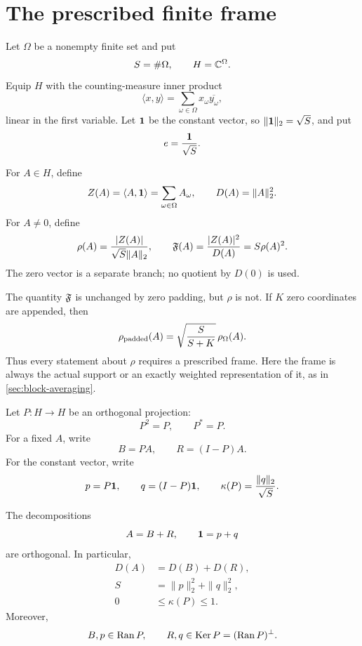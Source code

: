 \section{The prescribed finite frame}
\label{sec:finite-frame}

Let \(\Omega\) be a nonempty finite set and put
\[
 S=\#\Omega,\qquad
 H=\mathbb C^\Omega.
\]
Equip \(H\) with the counting-measure inner product
\[
 \langle x,y\rangle
 =
 \sum_{\omega\in\Omega}
 x_\omega\overline{y_\omega},
\]
linear in the first variable.  Let \(\mathbf 1\) be the constant vector,
so \(\|\mathbf 1\|_2=\sqrt S\), and put
\[
 e=\frac{\mathbf 1}{\sqrt S}.
\]

\begin{definition}
\label{def:literal-statistics}
For \(A\in H\), define
\[
 Z(A)=\langle A,\mathbf 1\rangle
 =\sum_{\omega\in\Omega}A_\omega,
\qquad
 D(A)=\|A\|_2^2.
\]
For \(A\ne0\), define
\[
 \rho(A)
 =\frac{|Z(A)|}{\sqrt{S}\|A\|_2},
\qquad
 \mathfrak F(A)
 =\frac{|Z(A)|^2}{D(A)}
 =S\rho(A)^2.
\]
The zero vector is a separate branch; no quotient by \(D(0)\) is
used.
\end{definition}

\begin{remark}
\label{rem:frame-part-statistic}
The quantity \(\mathfrak F\) is unchanged by zero padding, but \(\rho\)
is not.  If \(K\) zero coordinates are appended, then
\[
 \rho_{\rm padded}(A)
 =
 \sqrt{\frac{S}{S+K}}\,\rho_\Omega(A).
\]
Thus every statement about \(\rho\) requires a prescribed frame.
Here the frame is always the actual support or an exactly weighted
representation of it, as in \cref{sec:block-averaging}.
\end{remark}

Let \(P:H\to H\) be an orthogonal projection:
\[
 P^2=P,\qquad P^\ast=P.
\]
For a fixed \(A\), write
\begin{equation}
 B=PA,\qquad
 R=(I-P)A.
\label{eq:BR-def}
\end{equation}
For the constant vector, write
\begin{equation}
 p=P\mathbf 1,\qquad
 q=(I-P)\mathbf 1,\qquad
 \kappa(P)=\frac{\|q\|_2}{\sqrt S}.
\label{eq:pq-kappa-def}
\end{equation}

\begin{lemma}
\label{lem:orthogonal-ledger}
The decompositions
\[
 A=B+R,\qquad
 \mathbf 1=p+q
\]
are orthogonal.  In particular,
\begin{align}
 D(A)&=D(B)+D(R),
\label{eq:energy-pythagoras}\\
 S&=\|p\|_2^2+\|q\|_2^2,
\label{eq:constant-pythagoras}\\
 0&\le\kappa(P)\le1.
\end{align}
Moreover,
\[
 B,p\in\operatorname{Ran} P,\qquad
 R,q\in\operatorname{Ker} P=(\operatorname{Ran} P)^\perp.
\]
\end{lemma}

